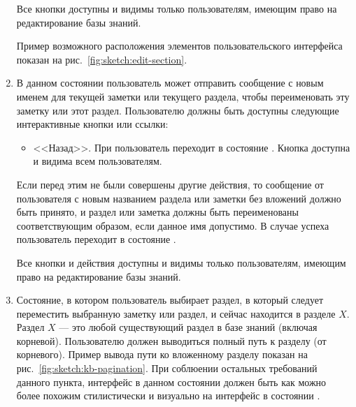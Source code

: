 \begin{enumerate}
            Все кнопки доступны и видимы только пользователям, имеющим право на редактирование
            базы знаний.

            Пример возможного расположения элементов пользовательского интерфейса показан на
            рис.~\ref{fig:sketch:edit-section}.

        \item \label{itm:req:ui:states:rename-kbo}

            В данном состоянии пользователь может отправить сообщение с новым именем для
            текущей заметки или текущего раздела, чтобы переименовать эту заметку или этот раздел.
            Пользователю должны быть доступны следующие интерактивные кнопки или ссылки:
            \begin{itemize}
                \item
                    <<Назад>>.
                    При  пользователь переходит в состояние
                    \hyperref[itm:req:ui:states:navx]
                    {}.
                    Кнопка доступна и видима всем пользователям.
            \end{itemize}
            Если перед этим не были совершены другие действия, то сообщение от пользователя
            с новым названием раздела или заметки без вложений должно быть принято,
            и раздел или заметка должны быть переименованы соответствующим образом,
            если данное имя допустимо.
            В случае успеха пользователь переходит в состояние
            \hyperref[itm:req:ui:states:navx]
            {}.

            Все кнопки и действия доступны и видимы только пользователям, имеющим право на редактирование
            базы знаний.

        \item \label{itm:req:ui:states:move-kbo}

            Состояние, в котором пользователь выбирает раздел, в который следует переместить
            выбранную заметку или раздел, и сейчас находится в разделе \(X\).
            Раздел \(X\) --- это любой существующий раздел в базе знаний (включая корневой).
            Пользователю должен выводиться полный путь к разделу (от корневого). Пример
            вывода пути ко вложенному разделу показан на рис.~\ref{fig:sketch:kb-pagination}.
            При соблюении остальных требований данного пункта, интерфейс в данном состоянии
            должен быть как можно более похожим стилистически и визуально на интерфейс
            в состоянии
            \hyperref[itm:req:ui:states:navx]
            {}.


\end{enumerate}
